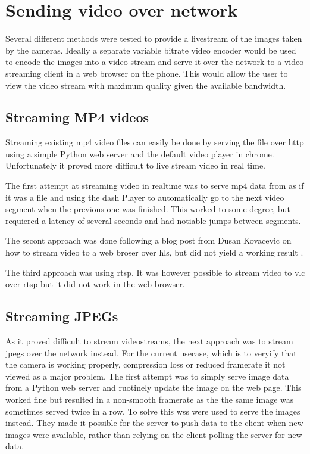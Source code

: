 
\section{Sending video over network}
Several different methods were tested to provide a livestream of the images taken by the cameras.
Ideally a separate variable bitrate video encoder would be used to encode the images into a video stream and serve it over the network to a video streaming client in a web browser on the phone.
This would allow the user to view the video stream with maximum quality given the available bandwidth.

\subsection{Streaming MP4 videos}
Streaming existing \gls{mp4} video files can easily be done by serving the file over \gls{http} using a simple Python web server and the default video player in \gls{chrome}.
Unfortunately it proved more difficult to live stream video in real time.

The first attempt at streaming video in realtime was to serve \gls{mp4} data from \gs as if it was a file and using the \gls{dash} Player to automatically go to the next video segment when the previous one was finished.
This worked to some degree, but requiered a latency of several seconds and had notiable jumps between segments.

The secont approach was done following a blog post from Dusan Kovacevic on how to stream video to a web broser over \gls{hls}, but did not yield a working result \cite{kovacevicStreamLiveVideo2020}.

The third approach was using \gls{rtsp}.
It was however possible to stream video to \gls{vlc} over \gls{rtsp} but it did not work in the web browser.

\subsection{Streaming JPEGs}
As it proved difficult to stream videostreams, the next approach was to stream \glspl{jpeg} over the network instead.
For the current usecase, which is to veryify that the camera is working properly, compression loss or reduced framerate it not viewed as a major problem.
The first attempt was to simply serve image data from a Python web server and ruotinely update the image on the web page.
This worked fine but resulted in a non-smooth framerate as the the same image was sometimes served twice in a row.
To solve this \glspl{ws} were used to serve the images instead.
They made it possible for the server to push data to the client when new images were available, rather than relying on the client polling the server for new data.

